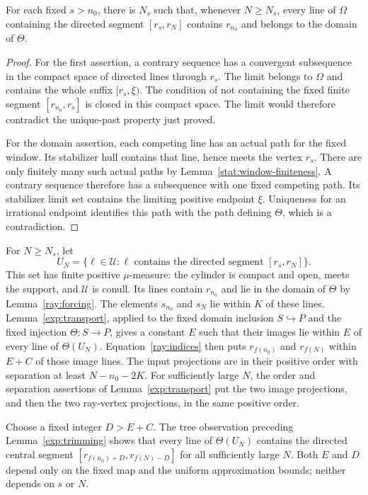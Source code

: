 \begin{lemma}\label{ray:forcing}
For each fixed $s>n_0$, there is $N_s$ such that, whenever $N\geq N_s$,
every line of $\Omega$ containing the directed segment $[r_s,r_N]$
contains $r_{n_0}$ and belongs to the domain of $\Theta$.
\end{lemma}
\begin{proof}
For the first assertion, a contrary sequence has a convergent
subsequence in the compact space of directed lines through $r_s$.
The limit belongs to $\Omega$ and contains the whole suffix
$[r_s,\xi)$. The condition of not containing the fixed finite segment
$[r_{n_0},r_s]$ is closed in this compact space. The limit would therefore
contradict the unique-past property just proved.

For the domain assertion, each competing line has an actual path for
the fixed window. Its stabilizer hull contains that line, hence meets
the vertex $r_s$. There are only finitely many such actual paths by
Lemma~\ref{stat:window-finiteness}. A contrary sequence therefore has a
subsequence with one fixed competing path. Its stabilizer limit set
contains the limiting positive endpoint $\xi$. Uniqueness for an
irrational endpoint identifies this path with the path defining
$\Theta$, which is a contradiction.
\end{proof}

For $N\geq N_s$, let
\[
 U_N=\{\ell\in\mathcal U:
              \ell\text{ contains the directed segment }[r_s,r_N]\}.
\]
This set has finite positive $\mu$-measure: the cylinder is compact and
open, meets the support, and $\mathcal U$ is conull. Its lines contain
$r_{n_0}$ and lie in the domain of $\Theta$ by Lemma~\ref{ray:forcing}.
The elements $s_{n_0}$ and $s_N$ lie within $K$ of these lines.
Lemma~\ref{exp:transport}, applied to the fixed domain inclusion
$S\hookrightarrow P$ and the fixed injection $\Theta:S\to P$,
gives a constant $E$ such that their images lie within $E$ of every
line of $\Theta(U_N)$. Equation~\eqref{ray:indices} then puts
$r_{f(n_0)}$ and $r_{f(N)}$ within $E+C$ of those image lines.
The input projections are in their positive order with separation at
least $N-n_0-2K$. For sufficiently large $N$, the order and separation
assertions of Lemma~\ref{exp:transport} put the two image projections,
and then the two ray-vertex projections, in the same positive order.

Choose a fixed integer $D>E+C$. The tree observation preceding
Lemma~\ref{exp:trimming} shows that every line of $\Theta(U_N)$
contains the directed central segment
$[r_{f(n_0)+D},r_{f(N)-D}]$ for all sufficiently large $N$.
Both $E$ and $D$ depend only on the fixed map and the uniform
approximation bounds; neither depends on $s$ or $N$.

